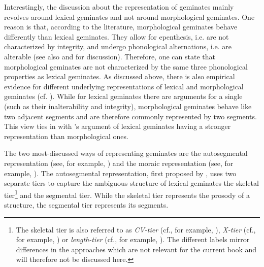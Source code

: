 Interestingly, the discussion about the representation of geminates mainly revolves around  lexical geminates and not around morphological  geminates. One reason is that, according to the literature,  morphological geminates behave differently than  lexical geminates. They allow for epenthesis, i.e. are not characterized by integrity, and  undergo phonological alternations, i.e. are alterable (see also \citealt{Kenstowicz.1994,Kirchner.2001} and \citealt{Ridouane.2010} for discussion). Therefore, one can state that  morphological geminates are not characterized by  the same three phonological properties as  lexical geminates. 
As discussed above, there is also empirical evidence for different underlying representations of lexical and  morphological geminates (cf. \citealt{Ridouane.2010,Galea.2014}). While for  lexical geminates there are arguments for a single  (such as their inalterability and integrity),  morphological geminates behave like two adjacent segments and are therefore commonly represented by two segments. This view ties in with \citeauthor{Ridouane.2010}'s argument of  lexical geminates having a stronger representation than morphological ones.

The two most-discussed ways of representing geminates are the {autosegmental representation} (see, for example, \citealt{Leben.1980,Hayes.1986b,Levin.1985,Ridouane.2010}) and the {moraic representation}  (see, for example, \citealt{Hayes.1989,Davis.2014,Topintzi.2008}). 
The {autosegmental representation}, first proposed by \cite{Leben.1980}, uses two separate tiers to capture the ambiguous structure of  lexical geminates \textendash the skeletal tier\footnote{The skeletal tier is also referred to as \textit{CV-tier} (cf., for example, \citealt{Hayes.1986b, Ridouane.2010,Ridouane.2017}), \textit{X-tier} (cf., for example, \citealt{Levin.1985}) or  \textit{length-tier} (cf., for example, \citealt{Vago.2011}). The different labels mirror differences in the approaches which are not relevant for the current book and will therefore not be discussed here.}
and the segmental tier. While the skeletal tier represents the prosody of a structure, the segmental tier represents its segments. 

